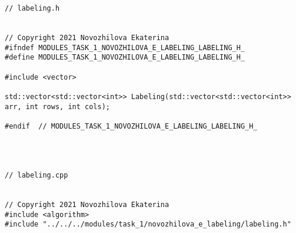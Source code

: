 \documentclass{report}
\begin{document}
\begin{lstlisting}
// labeling.h


// Copyright 2021 Novozhilova Ekaterina
#ifndef MODULES_TASK_1_NOVOZHILOVA_E_LABELING_LABELING_H_
#define MODULES_TASK_1_NOVOZHILOVA_E_LABELING_LABELING_H_

#include <vector>

std::vector<std::vector<int>> Labeling(std::vector<std::vector<int>> arr, int rows, int cols);

#endif  // MODULES_TASK_1_NOVOZHILOVA_E_LABELING_LABELING_H_




// labeling.cpp


// Copyright 2021 Novozhilova Ekaterina
#include <algorithm>
#include "../../../modules/task_1/novozhilova_e_labeling/labeling.h"


\end{lstlisting}
\end{document}
